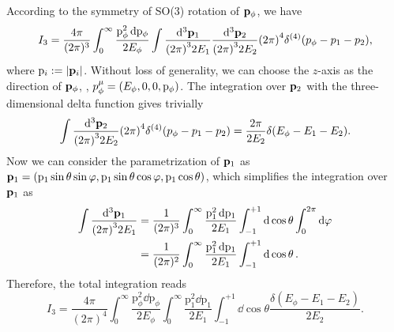 \documentclass{article}
\begin{document}
            According to the symmetry of SO(3) rotation of $\vb{p}_\phi$, we have
            \begin{equation}
                I_3 = \frac{4 \pi}{(2 \pi)^3} \int_0^\infty \frac{\mathrm{p}_\phi^2 \dd{\mathrm{p}_\phi}}{2 E_\phi} \int \frac{\dd[3]{\vb{p}_1}}{\qty(2 \pi)^3 2 E_1} \frac{\dd[3]{\vb{p}_2}}{\qty(2 \pi)^3 2 E_2} \qty(2 \pi)^4 \delta^{(4)}\qty(p_\phi - p_1 - p_2),
            \end{equation}
            where $\mathrm{p}_i := \abs{\vb{p}_i}$.
            Without loss of generality, we can choose the $z$-axis as the direction of $\vb{p}_\phi$, \ie, $p_\phi^\mu = \qty(E_\phi, 0, 0, \mathrm{p}_\phi)$.
            The integration over $\vb{p}_2$ with the three-dimensional delta function gives trivially
            \begin{equation}
                \int \frac{\dd[3]{\vb{p}_2}}{\qty(2 \pi)^3 2 E_2} \qty(2 \pi)^4 \delta^{(4)}\qty(p_\phi - p_1 - p_2) = \frac{2 \pi}{2 E_2} \delta(E_\phi - E_1 - E_2).
            \end{equation}
            Now we can consider the parametrization of $\vb{p}_1$ as $\vb{p}_1 = \qty(\mathrm{p}_1 \sin \theta \sin \varphi, \mathrm{p}_1 \sin \theta \cos \varphi, \mathrm{p}_1 \cos\theta)$, which simplifies the integration over $\vb{p}_1$ as
            \begin{equation}
                \begin{aligned}
                    \int \frac{\dd[3]{\vb{p}_1}}{\qty(2 \pi)^3 2 E_1} & = \frac{1}{(2 \pi)^3} \int_0^\infty \frac{\mathrm{p}_1^2 \dd{\mathrm{p}_1}}{2 E_1} \int_{-1}^{+1} \dd{\cos \theta} \int_0^{2 \pi} \dd{\varphi} \\
                    & = \frac{1}{(2 \pi)^2} \int_0^\infty \frac{\mathrm{p}_1^2 \dd{\mathrm{p}_1}}{2 E_1} \int_{-1}^{+1} \dd{\cos \theta}.
                \end{aligned}
            \end{equation}
            Therefore, the total integration reads
            \begin{equation}
                I_3 = \frac{4 \pi}{(2 \pi)^4} \int_0^\infty \frac{\mathrm{p}_\phi^2 \dd{\mathrm{p}_\phi}}{2 E_\phi} \int_0^\infty \frac{\mathrm{p}_1^2 \dd{\mathrm{p}_1}}{2 E_1} \int_{-1}^{+1} \dd{\cos \theta} \frac{\delta(E_\phi - E_1 - E_2)}{2 E_2}.
            \end{equation}
\end{document}
